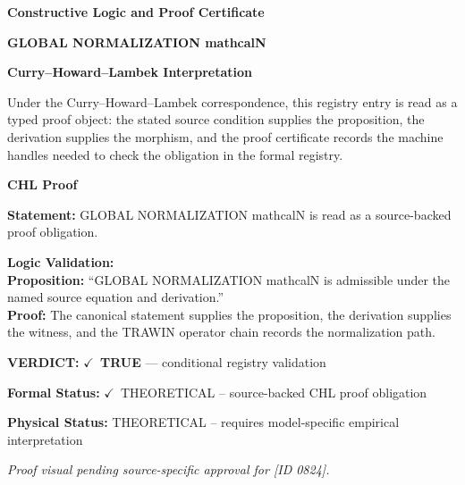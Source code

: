 \clearpage
\begingroup\tzpsupportsetup
\noindent\textbf{\fontsize{10.8pt}{12.8pt}\selectfont [ID 0824] Constructive Logic and Proof Certificate}\par
\noindent\textbf{\fontsize{10pt}{12pt}\selectfont GLOBAL NORMALIZATION mathcalN}\par
\vspace{0.45em}
\begingroup
\footnotesize
\setlength{\parskip}{0.22em}
\setlength{\parindent}{0pt}
\noindent\textbf{Curry--Howard--Lambek Interpretation}\par
Under the Curry--Howard--Lambek correspondence, this registry entry is read as a typed proof
object: the stated source condition supplies the proposition, the derivation supplies the
morphism, and the proof certificate records the machine handles needed to check the obligation
in the formal registry.

\vspace{0.45em}
\noindent\textbf{CHL Proof}\par
\textbf{Statement:} GLOBAL NORMALIZATION mathcalN is read as a source-backed proof obligation.

\textbf{Logic Validation:}\\
\textbf{Proposition:} ``GLOBAL NORMALIZATION mathcalN is admissible under the named source equation and derivation.''\\
\textbf{Proof:} The canonical statement supplies the proposition, the derivation supplies the witness, and the TRAWIN operator chain records the normalization path.

\textbf{VERDICT:} \ensuremath{\checkmark}\ \textbf{TRUE} --- conditional registry validation

\textbf{Formal Status:} \ensuremath{\checkmark}\ THEORETICAL -- source-backed CHL proof obligation

\textbf{Physical Status:} THEORETICAL -- requires model-specific empirical interpretation
\par\vspace{0.45em}
\par
\vfill
\begingroup\footnotesize\itshape
Proof visual pending source-specific approval for [ID 0824].
\par\endgroup
\vfill
\endgroup
\endgroup
